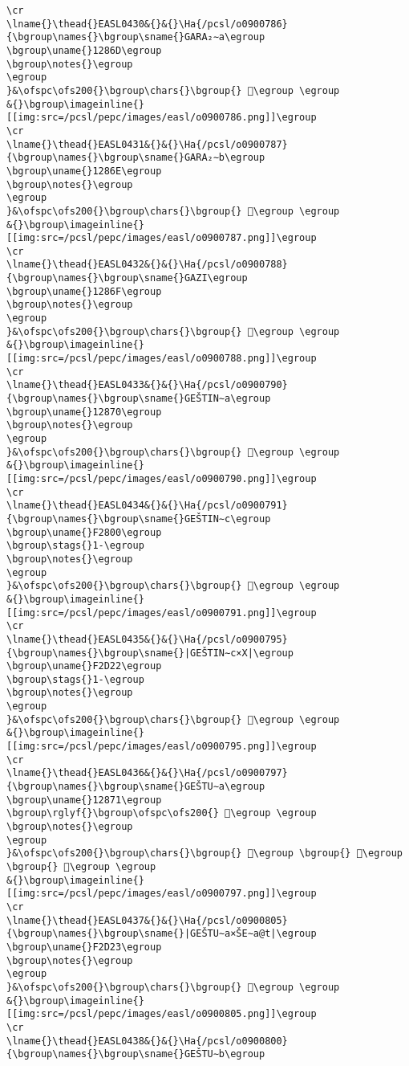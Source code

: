 \begin{verbatim}
\cr
\lname{}\thead{}EASL0430&{}&{}\Ha{/pcsl/o0900786}{\bgroup\names{}\bgroup\sname{}GARA₂∼a\egroup
\bgroup\uname{}1286D\egroup
\bgroup\notes{}\egroup
\egroup
}&\ofspc\ofs200{}\bgroup\chars{}\bgroup{} 𒡭\egroup \egroup
&{}\bgroup\imageinline{}[[img:src=/pcsl/pepc/images/easl/o0900786.png]]\egroup
\cr
\lname{}\thead{}EASL0431&{}&{}\Ha{/pcsl/o0900787}{\bgroup\names{}\bgroup\sname{}GARA₂∼b\egroup
\bgroup\uname{}1286E\egroup
\bgroup\notes{}\egroup
\egroup
}&\ofspc\ofs200{}\bgroup\chars{}\bgroup{} 𒡮\egroup \egroup
&{}\bgroup\imageinline{}[[img:src=/pcsl/pepc/images/easl/o0900787.png]]\egroup
\cr
\lname{}\thead{}EASL0432&{}&{}\Ha{/pcsl/o0900788}{\bgroup\names{}\bgroup\sname{}GAZI\egroup
\bgroup\uname{}1286F\egroup
\bgroup\notes{}\egroup
\egroup
}&\ofspc\ofs200{}\bgroup\chars{}\bgroup{} 𒡯\egroup \egroup
&{}\bgroup\imageinline{}[[img:src=/pcsl/pepc/images/easl/o0900788.png]]\egroup
\cr
\lname{}\thead{}EASL0433&{}&{}\Ha{/pcsl/o0900790}{\bgroup\names{}\bgroup\sname{}GEŠTIN∼a\egroup
\bgroup\uname{}12870\egroup
\bgroup\notes{}\egroup
\egroup
}&\ofspc\ofs200{}\bgroup\chars{}\bgroup{} 𒡰\egroup \egroup
&{}\bgroup\imageinline{}[[img:src=/pcsl/pepc/images/easl/o0900790.png]]\egroup
\cr
\lname{}\thead{}EASL0434&{}&{}\Ha{/pcsl/o0900791}{\bgroup\names{}\bgroup\sname{}GEŠTIN∼c\egroup
\bgroup\uname{}F2800\egroup
\bgroup\stags{}1-\egroup
\bgroup\notes{}\egroup
\egroup
}&\ofspc\ofs200{}\bgroup\chars{}\bgroup{} 󲠀\egroup \egroup
&{}\bgroup\imageinline{}[[img:src=/pcsl/pepc/images/easl/o0900791.png]]\egroup
\cr
\lname{}\thead{}EASL0435&{}&{}\Ha{/pcsl/o0900795}{\bgroup\names{}\bgroup\sname{}|GEŠTIN∼c×X|\egroup
\bgroup\uname{}F2D22\egroup
\bgroup\stags{}1-\egroup
\bgroup\notes{}\egroup
\egroup
}&\ofspc\ofs200{}\bgroup\chars{}\bgroup{} 󲴢\egroup \egroup
&{}\bgroup\imageinline{}[[img:src=/pcsl/pepc/images/easl/o0900795.png]]\egroup
\cr
\lname{}\thead{}EASL0436&{}&{}\Ha{/pcsl/o0900797}{\bgroup\names{}\bgroup\sname{}GEŠTU∼a\egroup
\bgroup\uname{}12871\egroup
\bgroup\rglyf{}\bgroup\ofspc\ofs200{} 𒡱\egroup \egroup
\bgroup\notes{}\egroup
\egroup
}&\ofspc\ofs200{}\bgroup\chars{}\bgroup{} 𒡱\egroup \bgroup{} 𒡲\egroup \bgroup{} 𒡳\egroup \egroup
&{}\bgroup\imageinline{}[[img:src=/pcsl/pepc/images/easl/o0900797.png]]\egroup
\cr
\lname{}\thead{}EASL0437&{}&{}\Ha{/pcsl/o0900805}{\bgroup\names{}\bgroup\sname{}|GEŠTU∼a×ŠE∼a@t|\egroup
\bgroup\uname{}F2D23\egroup
\bgroup\notes{}\egroup
\egroup
}&\ofspc\ofs200{}\bgroup\chars{}\bgroup{} 󲴣\egroup \egroup
&{}\bgroup\imageinline{}[[img:src=/pcsl/pepc/images/easl/o0900805.png]]\egroup
\cr
\lname{}\thead{}EASL0438&{}&{}\Ha{/pcsl/o0900800}{\bgroup\names{}\bgroup\sname{}GEŠTU∼b\egroup

\end{verbatim}
